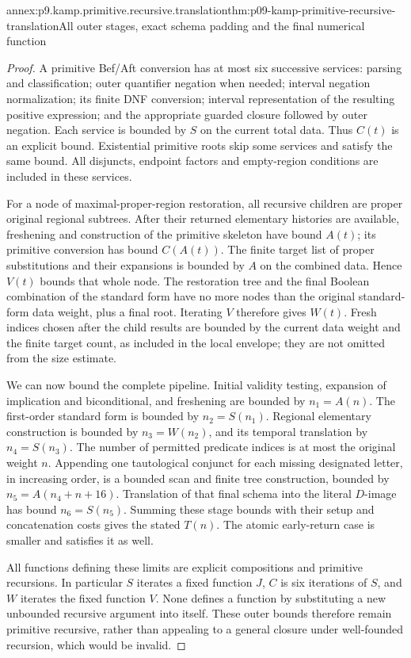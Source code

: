\begin{annexitem}{annex:p9.kamp.primitive.recursive.translation}{thm:p09-kamp-primitive-recursive-translation}{All outer stages, exact schema padding and the final numerical function}
\begin{proof}
A primitive Bef/Aft conversion has at most six successive services:
parsing and classification; outer quantifier negation when needed;
interval negation normalization; its finite DNF conversion; interval
representation of the resulting positive expression; and the appropriate
guarded closure followed by outer negation. Each service is bounded
by \(S\) on the current total data. Thus \(C(t)\) is
an explicit bound. Existential primitive roots skip some services
and satisfy the same bound. All disjuncts, endpoint factors and
empty-region conditions are included in these services.

For a node of maximal-proper-region restoration, all recursive children
are proper original regional subtrees. After their returned elementary
histories are available, freshening and construction of the primitive
skeleton have bound \(A(t)\); its primitive conversion has
bound \(C(A(t))\). The finite target list of proper substitutions
and their expansions is bounded by \(A\) on the combined data.
Hence \(V(t)\) bounds that whole node. The restoration tree
and the final Boolean combination of the standard form have no
more nodes than the original standard-form data weight, plus a
final root. Iterating \(V\) therefore gives \(W(t)\).
Fresh indices chosen after the child results are bounded by the
current data weight and the finite target count, as included in
the local envelope; they are not omitted from the size estimate.

We can now bound the complete pipeline. Initial validity testing,
expansion of implication and biconditional, and freshening are
bounded by \(n_1=A(n)\). The first-order standard form is
bounded by \(n_2=S(n_1)\). Regional elementary construction
is bounded by \(n_3=W(n_2)\), and its temporal translation
by \(n_4=S(n_3)\). The number of permitted predicate indices
is at most the original weight \(n\). Appending one
tautological conjunct for each missing designated letter, in
increasing order, is a bounded scan and finite tree construction,
bounded by \(n_5=A(n_4+n+16)\). Translation of that final
schema into the literal \(D\)-image has bound \(n_6=S(n_5)\).
Summing these stage bounds with their setup and concatenation costs
gives the stated \(T(n)\). The atomic early-return case is
smaller and satisfies it as well.

All functions defining these limits are explicit compositions and
primitive recursions. In particular \(S\) iterates a fixed
function \(J\), \(C\) is six iterations of \(S\),
and \(W\) iterates the fixed function \(V\). None defines
a function by substituting a new unbounded recursive argument into
itself. These outer bounds therefore remain primitive recursive,
rather than appealing to a general closure under well-founded
recursion, which would be invalid.


\end{proof}
\end{annexitem}
